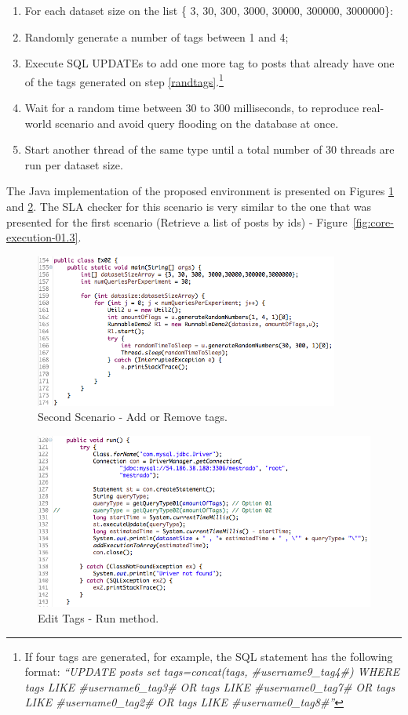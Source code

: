 \begin{enumerate}
\item{For each dataset size on the list \{ 3, 30, 300, 3000, 30000, 300000, 3000000\}:}
\item{Randomly generate a number of tags between 1 and 4; \label{randtags}}
\item{Execute SQL UPDATEs to add one more tag to posts that already have one of the tags generated on step \ref{randtags}.\footnote{If four tags are generated, for example, the SQL statement has the following format: \textit{``UPDATE posts set tags=concat(tags, \#username9\_tag4\#) WHERE tags LIKE \#username6\_tag3\# OR tags LIKE \#username0\_tag7\# OR tags LIKE \#username0\_tag2\# OR tags LIKE \#username0\_tag8\#''}}}
\item{Wait for a random time between 30 to 300 milliseconds, to reproduce real-world scenario and avoid	query flooding on the database at once.}
\item{Start another thread of the same type until a total number of 30 threads are run per dataset size.}
\end{enumerate}

The Java implementation of the proposed environment is presented on Figures \ref{fig:tags-java-01} and \ref{fig:tags-java-02}. The SLA checker for this scenario is very similar to the one that was presented for the first scenario (Retrieve a list of posts by ids) - Figure~\ref{fig:core-execution-01.3}.


\begin{figure}[ht!]
\centering
\includegraphics[width=100mm]{Imagens/tags-java-01.png}
\caption{Second Scenario - Add or Remove tags.\label{fig:tags-java-01}}
\end{figure}

\begin{figure}[ht!]
\centering
\includegraphics[width=150mm]{Imagens/tags-java-02.png}
\caption{Edit Tags - Run method.\label{fig:tags-java-02}}
\end{figure}

